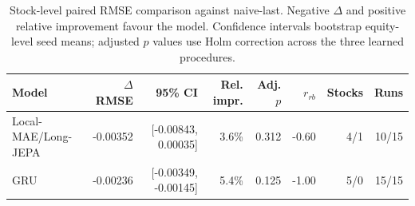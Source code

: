 \begin{table}[t]
\centering
\small
\caption{Stock-level paired RMSE comparison against naive-last. Negative $\Delta$ and positive relative improvement favour the model. Confidence intervals bootstrap equity-level seed means; adjusted $p$ values use Holm correction across the three learned procedures.}
\label{tab:paired_rmse_naive}
\begin{tabular}{lrrrrrrr}
\toprule
Model & $\Delta$RMSE & 95\% CI & Rel. impr. & Adj. $p$ & $r_{rb}$ & Stocks & Runs \\
\midrule
Local-MAE/Long-JEPA & -0.00352 & [-0.00843, 0.00035] & 3.6\% & 0.312 & -0.60 & 4/1 & 10/15 \\
GRU & -0.00236 & [-0.00349, -0.00145] & 5.4\% & 0.125 & -1.00 & 5/0 & 15/15 \\
\bottomrule
\end{tabular}
\end{table}
